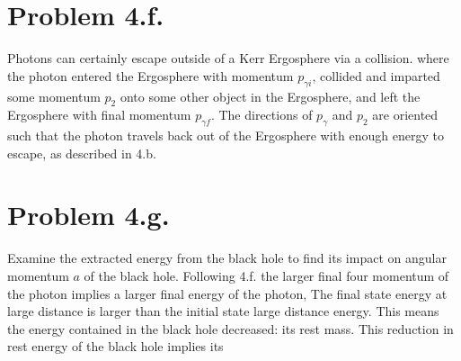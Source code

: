 \documentclass{article}
\begin{document}
\section*{Problem 4.f.}
Photons can certainly escape outside of a Kerr Ergosphere via a collision.
where the photon entered the Ergosphere with momentum $p_{\gamma i}$, collided and imparted some momentum $p_2$ onto some other object in the Ergosphere, and left the Ergosphere with final momentum $p_{\gamma f}$. The directions of $p_\gamma$ and $p_2$ are oriented such that the photon travels back out of the Ergosphere with enough energy to escape, as described in 4.b.
\section*{Problem 4.g.}
Examine the extracted energy from the black hole to find its impact on angular momentum $a$ of the black hole. Following 4.f. the larger final four momentum of the photon implies a larger final energy of the photon,
The final state energy at large distance is larger than the initial state large distance energy. This means the energy contained in the black hole decreased: its rest mass. This reduction in rest energy of the black hole implies its 
\end{document}
